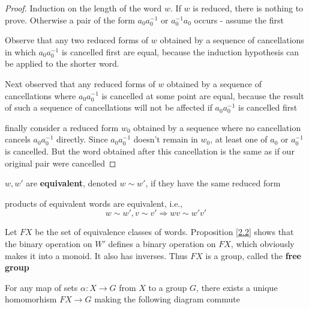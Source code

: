 \documentclass[11pt]{article}
\begin{document}
\begin{proof}
Induction on the length of the word \(w\). If \(w\) is reduced, there is nothing to prove.
Otherwise a pair of the form \(a_0a_0^{-1}\) or \(a_0^{-1}a_0\) occurs - assume the first

Observe that any two reduced forms of \(w\) obtained by a sequence of cancellations in
which \(a_0a_0^{-1}\) is cancelled first are equal, because the induction hypothesis can be
applied to the shorter word.

Next observed that any reduced forms of \(w\) obtained by a sequence of cancellations
where \(a_0a_0^{-1}\) is cancelled at some point are equal, because the result of such a
sequence of cancellations will not be affected if \(a_0a_0^{-1}\) is cancelled first

finally consider a reduced form \(w_0\) obtained by a sequence where no cancellation
cancels \(a_0a_0^{-1}\) directly. Since \(a_0a_0^{-1}\) doesn't remain in \(w_0\), at least one
of \(a_0\) or \(a_0^{-1}\) is cancelled. But the word obtained after this cancellation is the
same as if our original pair were cancelled
\end{proof}

\(w,w'\) are \textbf{equivalent}, denoted \(w\sim w'\), if they have the same reduced form

\begin{proposition}[]
\label{2.2}
products of equivalent words are equivalent, i.e.,
\begin{equation*}
w\sim w',v\sim v'\Rightarrow wv\sim w'v'
\end{equation*}
\end{proposition}

Let \(FX\) be the set of equivalence classes of words. Proposition \ref{2.2} shows that the binary
operation on \(W'\) defines a binary operation on \(FX\), which obviously makes it into a
monoid. It also has inverses. Thus \(FX\) is a group, called the \textbf{free group}

\begin{proposition}[]
\label{2.3}
For any map of sets \(\alpha:X\to G\) from \(X\) to a group \(G\), there exists a unique
homomorhism \(FX\to G\) making the following diagram commute
\begin{center}\end{center}
\end{proposition}
\end{document}
